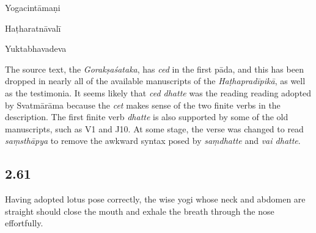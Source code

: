 \begin{ekdosis}
\begin{testimonia}[hp02_060]
Yogacintāmaṇi

\begin{versinnote}
\end{versinnote}

Haṭharatnāvalī

\begin{versinnote}
\end{versinnote}

Yuktabhavadeva

\begin{versinnote}
\end{versinnote}
\end{testimonia}

\begin{philcomm}[hp02_060]
The source text, the \emph{Gorakṣaśataka}, has \emph{ced} in the first pāda, and this has been dropped in nearly all of the available manuscripts of the \emph{Haṭhapradīpikā}, as well as the testimonia. It seems likely that \emph{ced dhatte} was the reading reading adopted by Svatmārāma because the \emph{cet} makes sense of the two finite verbs in the description. The first finite verb \emph{dhatte} is also supported by some of the old manuscripts, such as V1 and J10. At some stage, the verse was changed to read \emph{saṃsthāpya} to remove the awkward syntax posed by \emph{saṃdhatte} and \emph{vai dhatte}.
\end{philcomm}

\subsection*{2.61}
\begin{translation}[hp02_061]
Having adopted lotus pose correctly, the wise yogi whose neck and abdomen are straight should close the mouth and exhale the breath through the nose effortfully.
\end{translation}


\end{ekdosis}
